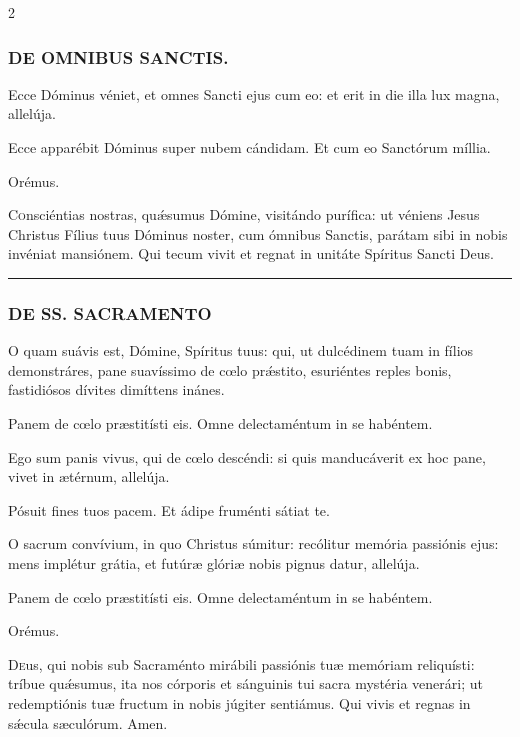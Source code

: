 \documentclass[9pt,twoside]{extarticle}
\begin{document}
\begin{multicols}{2}
\subsubsection*{\center \textsc{DE OMNIBUS SANCTIS.}}
\begin{tightlist}{}
\item {} Ecce Dóminus véniet, et omnes Sancti ejus cum eo: et erit in die illa lux magna, allelúja.
\item {} Ecce apparébit Dóminus super nubem cándidam.  Et cum eo Sanctórum míllia.
\item Orémus. \hfill {}
\end{tightlist}
\lettrine{C}onsciéntias nostras, quǽsumus Dómine, visitándo purífica: ut véniens Jesus Christus Fílius tuus Dóminus noster, cum ómnibus Sanctis, parátam sibi in nobis invéniat mansiónem. Qui tecum vivit et regnat in unitáte Spíritus Sancti Deus.

\begin{center}\textcolor{red}{\rule{\linewidth}{0.5pt}} \end{center}

\subsubsection*{\center \textsc{DE SS. SACRAMENTO}}
\begin{tightlist}{}
\item {}
\item {} O quam suávis est, Dómine, Spíritus tuus: qui, ut dulcédinem tuam in fílios demonstráres, pane suavíssimo de cœlo prǽstito, esuriéntes reples bonis, fastidiósos dívites dimíttens inánes.
\item {} Panem de cœlo præstitísti eis.  Omne delectaméntum in se habéntem.
\item {} Ego sum panis vivus, qui de cœlo descéndi: si quis manducáverit ex hoc pane, vivet in ætérnum, allelúja.
\item {} Pósuit fines tuos pacem.  Et ádipe fruménti sátiat te.
\item {} O sacrum convívium, in quo Christus súmitur: recólitur memória passiónis ejus: mens implétur grátia, et futúræ glóriæ nobis pignus datur, allelúja.
\item {} Panem de cœlo præstitísti eis.  Omne delectaméntum in se habéntem.
\item Orémus. \hfill {}
\end{tightlist}
\lettrine{D}eus, qui nobis sub Sacraménto mirábili passiónis tuæ memóriam reliquísti: tríbue quǽsumus, ita nos córporis et sánguinis tui sacra mystéria venerári; ut redemptiónis tuæ fructum in nobis júgiter sentiámus. Qui vivis et regnas in sǽcula sæculórum. Amen.


\end{multicols}
\end{document}
